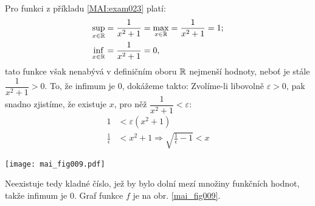 \wikitextrule
\begin{example}\label{MAI:exam021} 
  Pro funkci z příkladu \ref{MAI:exam023} platí:
  \begin{align*}
    \sup_{x\in\mathbb{R}}&=\frac{1}{x^2+1}=\max_{x\in\mathbb{R}}=\frac{1}{x^2+1}=1;   \\
    \inf_{x\in\mathbb{R}}&=\frac{1}{x^2+1}=0,
  \end{align*}
  tato funkce však nenabývá v definičním oboru $\mathbb{R}$ nejmenší hodnoty, neboť je stále 
  $\dfrac{1}{x^2+1}>0$. To, že infimum je $0$, dokážeme takto: Zvolíme-li libovolně 
  $\varepsilon>0$, pak snadno zjistíme, že existuje $x$, pro něž 
  $\dfrac{1}{x^2+1}<\varepsilon$:
  \begin{align*}
    1                  &< \varepsilon(x^2+1) \\
    \frac{1}{\epsilon} &< x^2+1 \Rightarrow \sqrt{\frac{1}{\epsilon}-1} < x
  \end{align*} 
  
  {\centering
   \captionsetup{type=figure}
%   
   \texttt{[image: mai\_fig009.pdf]}
   \label{mai_fig009}
  \par}
  
  Neexistuje tedy kladné číslo, jež by bylo dolní mezí množiny funkčních hodnot, takže infimum je 
  $0$. Graf funkce $f$ je na obr. \ref{mai_fig009}.
\end{example}